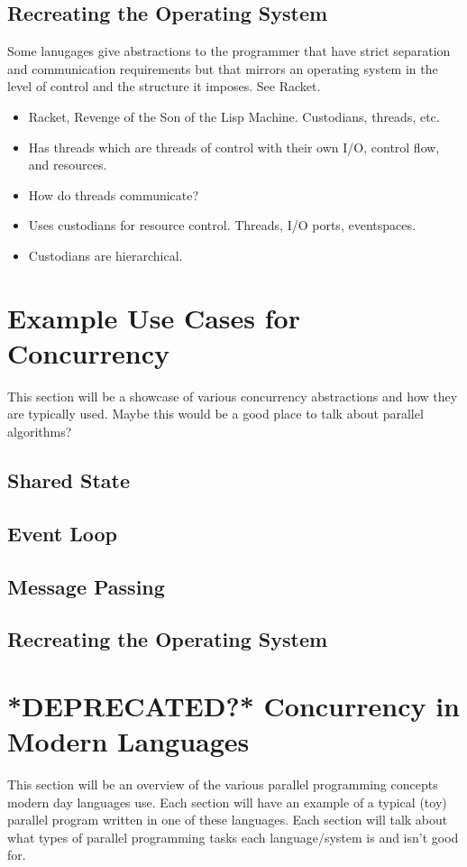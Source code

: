 \documentclass{article}
\begin{document}
\subsection{Recreating the Operating System}

Some lanugages give abstractions to the programmer that have strict
separation and communication requirements but that mirrors an operating
system in the level of control and the structure it imposes. See Racket.

\begin{itemize}
  \item Racket, Revenge of the Son of the Lisp Machine. Custodians, threads,
        etc.
  \item Has threads which are threads of control with their own I/O, control
        flow, and resources.
  \item How do threads communicate?
  \item Uses custodians for resource control. Threads, I/O ports, eventspaces.
  \item Custodians are hierarchical.
\end{itemize}

\section{Example Use Cases for Concurrency}

This section will be a showcase of various concurrency abstractions
and how they are typically used. Maybe this would be a good place to
talk about parallel algorithms?

\subsection{Shared State}

\subsection{Event Loop}

\subsection{Message Passing}

\subsection{Recreating the Operating System}

\section{*DEPRECATED?* Concurrency in Modern Languages}
This section will be an overview of the various parallel programming
concepts modern day languages use. Each section will have an example of
a typical (toy) parallel program written in one of these languages. Each
section will talk about what types of parallel programming tasks
each language/system is and isn't good for.
\end{document}
